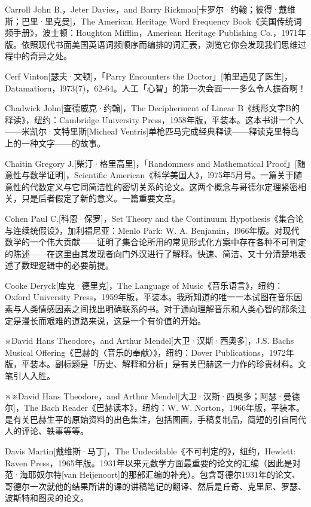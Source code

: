 \documentclass[
  12pt,
  twoside,
  openright,
  oldfontcommands,
]{memoir}
\begin{document}
Carroll John B.，Jeter Davies，and Barry
Rickman{[}卡罗尔·约翰；彼得·戴维斯；巴里·里克曼{]}，The American
Heritage Word Frequency Book《美国传统词频手册》，波士顿：Houghton
Mifflin，American Heritage Publishing
Co.，1971年版。依照现代书面美国英语词频顺序而编排的词汇表，浏览它你会发现我们思维过程中的奇异之处。

Cerf Vinton{[}瑟夫·文顿{]}，「Parry Encounters the
Doctor」{[}帕里遇见了医生{]}，Datamatioru，l973(7)，62-64。人工「心智」的第一次会面一一多么令人振奋啊！

Chadwick John{[}查德威克·约翰{]}，The Decipherment of Linear
B《线形文字B的释读》，纽约：Cambridge University
Press，1958年版，平装本。这本书讲一个人------米凯尔·文特里斯{[}Micheal
Ventris{]}单枪匹马完成经典释读------释读克里特岛上的一种文字------的故事。

Chaitin Gregory J.{[}柴汀·格里高里{]}，「Randomness and Mathematical
Proof」{[}随意性与数学证明{]}，Scientific
American《科学美国人》，l975年5月号。一篇关于随意性的代数定义与它同简洁性的密切关系的论文。这两个概念与哥德尔定理紧密相关，只是后者假定了新的意义。一篇重要文章。

Cohen Paul C.{[}科恩·保罗{]}，Set Theory and the Continuum
Hypothesis《集合论与连续统假设》，加利福尼亚：Menlo Park: W. A.
Benjamin，l966年版。对现代数学的一个伟大贡献------证明了集合论所用的常见形式化方案中存在各种不可判定的陈述------在这里由其发现者向门外汉进行了解释。快速、简洁、又十分清楚地表述了数理逻辑中的必要前提。

Cooke Deryck{[}库克·德里克{]}，The Language of
Music《音乐语言》，纽约：Oxford University
Press，1959年版，平装本。我所知道的唯一一本试图在音乐因素与人类情感因素之间找出明确联系的书。对于通向理解音乐和人类心智的那条注定是漫长而艰难的道路来说，这是一个有价值的开始。

※David Hans Theodore，and Arthur Mendel{[}大卫·汉斯·西奥多{]}，J.S.
Bach\textquotesingle s Musical
Offering《巴赫的〈音乐的奉献〉》，纽约：Dover
Publications，1972年版，平装本。副标题是「历史、解释和分析」是有关巴赫这一力作的珍贵材料。文笔引人入胜。

※※David Hans Theodore，and Arthur
Mendel{[}大卫·汉斯·西奥多；阿瑟·曼德尔{]}，The Bach
Reader《巴赫读本》，纽约：W. W.
Norton，1966年版，平装本。是有关巴赫生平的原始资料的出色集注，包括图画，手稿复制品，简短的引自同代人的评论、轶事等等。

Davis Martin{[}戴维斯·马丁{]}，The
Undecidable《不可判定的》，纽约，Hewlett: Raven
Press，1965年版。1931年以来元数学方面最重要的论文的汇编（因此是对范·海耶奴尔特{[}van
Heijenoort{]}的那部汇编的补充）。包含哥德尔1931年的论文、哥德尔一次就他的结果所讲的课的讲稿笔记的翻译、然后是丘奇、克里尼、罗瑟、波斯特和图灵的论文。
\end{document}
